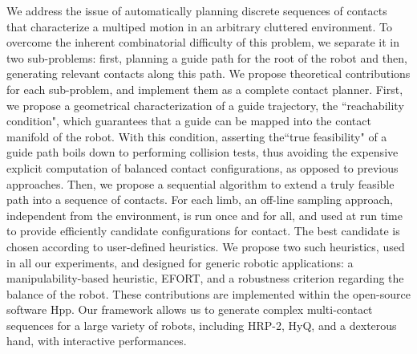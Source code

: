 We address the issue of automatically planning discrete sequences of contacts
that characterize a multiped motion in an arbitrary cluttered environment.
To overcome the inherent combinatorial difficulty of this problem, we separate it
in two sub-problems: first, planning a guide path for the root of the robot and
then, generating relevant contacts along this path.
We propose theoretical contributions for each sub-problem, and implement them
as a complete contact planner. 
First, we propose a geometrical characterization of a guide trajectory, the ``reachability condition", which guarantees that a
guide can be mapped into the contact manifold of the robot. With this condition, asserting the``true feasibility" 
of a guide path boils down to performing collision tests, thus avoiding the expensive explicit computation of balanced contact configurations, as opposed to previous approaches.
Then, we propose a sequential algorithm to extend a truly feasible path into a sequence of contacts. For each limb, an off-line sampling approach,
independent from the environment, is run once and for all, and used at run time to provide efficiently candidate configurations for contact.
The best candidate is chosen according to user-defined heuristics. We propose two such heuristics, used in all our experiments, and 
designed for generic robotic applications: a manipulability-based heuristic, EFORT, and a robustness criterion regarding the balance of the robot.
These contributions are implemented within the open-source software Hpp. Our framework allows us to generate complex multi-contact sequences for a large
variety of robots, including HRP-2, HyQ, and a dexterous hand, with interactive performances.
